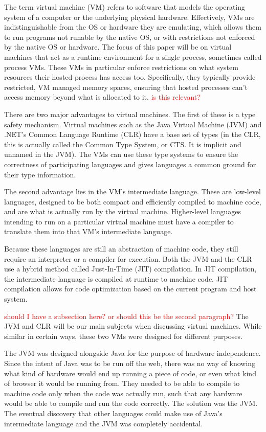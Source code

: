 \documentclass{sig-alternate}
\newcommand{\mycomment}[1]{\textcolor{red}{#1}}
\begin{document}
The term virtual machine (VM) refers to software that models the operating system of a computer or the underlying physical hardware. Effectively, VMs are indistinguishable from the OS or hardware they are emulating, which allows them to run programs not runable by the native OS, or with restrictions not enforced by the native OS or hardware.
The focus of this paper will be on virtual machines that act as a runtime environment for a single process, sometimes called process VMs. These VMs in particular enforce restrictions on what system resources their hosted process has access too. Specifically, they typically provide restricted, VM managed memory spaces, ensuring that hosted processes can't access memory beyond what is allocated to it.\cite{wiki:VM} \mycomment{is this relevant?}

There are two major advantages to virtual machines. The first of these is a type safety mechanism. Virtual machines such as the Java Virtual Machine (JVM) and .NET's Common Language Runtime (CLR) have a base set of types (in the CLR, this is actually called the Common Type System, or CTS. It is implicit and unnamed in the JVM). The VMs can use these type systems to ensure the correctness of participating languages and gives languages a common ground for their type information.

The second advantage lies in the VM's intermediate language. These are low-level languages, designed to be both compact and efficiently compiled to machine code, and are what is actually run by the virtual machine. Higher-level languages intending to run on a particular virtual machine must have a compiler to translate them into that VM's intermediate language.

Because these languages are still an abstraction of machine code, they still require an interpreter or a compiler for execution. Both the JVM and the CLR use a hybrid method called Just-In-Time (JIT) compilation. In JIT compilation, the intermediate language is compiled at runtime to machine code. JIT compilation allows for code optimization based on the current program and host system. \cite{wiki:JIT} 

\mycomment{should I have a subsection here? or should this be the second paragraph?}
The JVM and CLR will be our main subjects when discussing virtual machines. While similar in certain ways, these two VMs were designed for different purposes.

The JVM was designed alongside Java for the purpose of hardware independence. Since the intent of Java was to be run off the web, there was no way of knowing what kind of hardware would end up running a piece of code, or even what kind of browser it would be running from. They needed to be able to compile to machine code only when the code was actually run, such that any hardware would be able to compile and run the code correctly. The solution was the JVM. The eventual discovery that other languages could make use of Java's intermediate language and the JVM was completely accidental.
\end{document}
